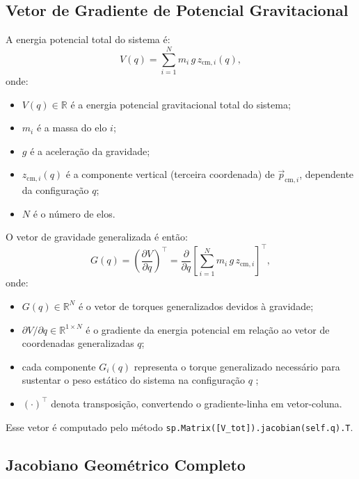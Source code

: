 \subsection{Vetor de Gradiente de Potencial Gravitacional}

A energia potencial total do sistema é:
\begin{equation}
    V(q) = \sum_{i=1}^{N} m_i\, g\, z_{\text{cm},i}(q),
    \label{eq:V_grav}
\end{equation}
onde:
\begin{itemize}
    \item $V(q) \in \mathbb{R}$ é a energia potencial gravitacional total do sistema;
    \item $m_i$ é a massa do elo $i$;
    \item $g$ é a aceleração da gravidade;
    \item $z_{\text{cm},i}(q)$ é a componente vertical (terceira coordenada) de $\vec{p}_{\text{cm},i}$, dependente da configuração $q$;
    \item $N$ é o número de elos.
\end{itemize}

O vetor de gravidade generalizada é então:
\begin{equation}
    G(q) = \left(\frac{\partial V}{\partial q}\right)^\top = \frac{\partial}{\partial q} \left[\sum_{i=1}^{N} m_i\, g\, z_{\text{cm},i}\right]^\top,
    \label{eq:G_vec}
\end{equation}
onde:
\begin{itemize}
    \item $G(q) \in \mathbb{R}^{N}$ é o vetor de torques generalizados devidos à gravidade;
    \item $\partial V/\partial q \in \mathbb{R}^{1\times N}$ é o gradiente da energia potencial em relação ao vetor de coordenadas generalizadas $q$;
    \item cada componente $G_i(q)$ representa o torque generalizado necessário para sustentar o peso estático do sistema na configuração $q$ \cite{craig1989introduction, spong2020robot};
    \item $(\cdot)^\top$ denota transposição, convertendo o gradiente-linha em vetor-coluna.
\end{itemize}
Esse vetor é computado pelo método \texttt{sp.Matrix([V\_tot]).jacobian(self.q).T}.

\subsection{Jacobiano Geométrico Completo}

